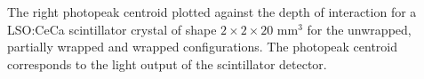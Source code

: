 \label{fig:lightoutput-20} The right photopeak centroid plotted against the depth of interaction for a LSO:CeCa scintillator crystal of shape $2\times2\times20$ mm$^3$ for the unwrapped, partially wrapped and wrapped configurations. The photopeak centroid corresponds to the light output of the scintillator detector.